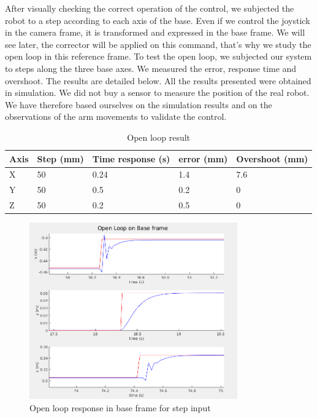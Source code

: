 \bigbreak 
After visually checking the correct operation of the control, we subjected the robot to a step according to each axis of the base. Even if we control the joystick in the camera frame, it is transformed and expressed in the base frame. We will see later, the corrector will be applied on this command, that's why we study the open loop in this reference frame. To test the open loop, we subjected our system to steps along the three base axes. We measured the error, response time and overshoot. The results are detailed below. All the results presented were obtained in simulation. We did not buy a sensor to measure the position of the real robot. We have therefore based ourselves on the simulation results and on the observations of the arm movements to validate the control.

\begin{table}[ht]
    \centering
    \begin{tabular}{|p{1cm} | p{2.3cm} | p{3.5cm} | p{2.3cm}| p{3.3cm} |} 
        \hline
        \textbf{Axis} & \textbf{Step (mm)} &\textbf{Time response (s)} & \textbf{error (mm)} & \textbf{Overshoot (mm)}\\ [0.3ex]
        \hline
        X & 50 & 0.24 & 1.4 & 7.6 \\ 
        \hline
        Y & 50 & 0.5 & 0.2 & 0 \\ 
        \hline
        Z & 50 & 0.2 & 0.5 & 0 \\ 
        \hline
    \end{tabular}
    \caption{Open loop result}
\end{table}
\FloatBarrier

\begin{figure}[H]
    \centering
    \includegraphics[width=0.8\textwidth]{Images/Section07/openloopBaseFrame.png}
    \caption{Open loop response in base frame for step input}
    \label{fig:OpenLoopGraph}
\end{figure}

